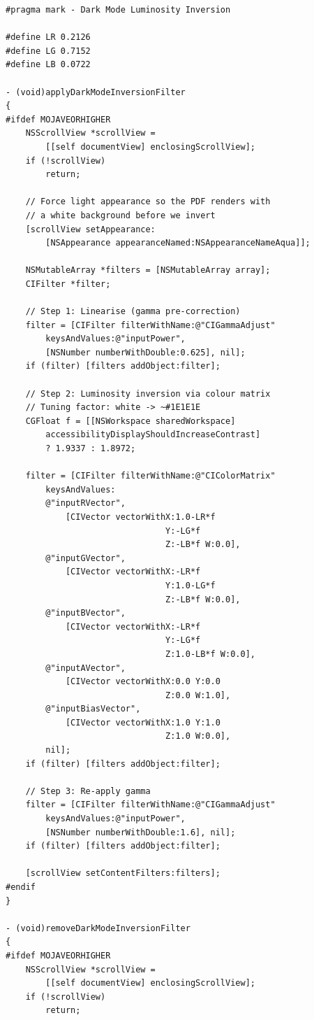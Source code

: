 \documentclass[11pt,a4paper]{article}
\begin{document}
\begin{lstlisting}
#pragma mark - Dark Mode Luminosity Inversion

#define LR 0.2126
#define LG 0.7152
#define LB 0.0722

- (void)applyDarkModeInversionFilter
{
#ifdef MOJAVEORHIGHER
    NSScrollView *scrollView =
        [[self documentView] enclosingScrollView];
    if (!scrollView)
        return;

    // Force light appearance so the PDF renders with
    // a white background before we invert
    [scrollView setAppearance:
        [NSAppearance appearanceNamed:NSAppearanceNameAqua]];

    NSMutableArray *filters = [NSMutableArray array];
    CIFilter *filter;

    // Step 1: Linearise (gamma pre-correction)
    filter = [CIFilter filterWithName:@"CIGammaAdjust"
        keysAndValues:@"inputPower",
        [NSNumber numberWithDouble:0.625], nil];
    if (filter) [filters addObject:filter];

    // Step 2: Luminosity inversion via colour matrix
    // Tuning factor: white -> ~#1E1E1E
    CGFloat f = [[NSWorkspace sharedWorkspace]
        accessibilityDisplayShouldIncreaseContrast]
        ? 1.9337 : 1.8972;

    filter = [CIFilter filterWithName:@"CIColorMatrix"
        keysAndValues:
        @"inputRVector",
            [CIVector vectorWithX:1.0-LR*f
                                Y:-LG*f
                                Z:-LB*f W:0.0],
        @"inputGVector",
            [CIVector vectorWithX:-LR*f
                                Y:1.0-LG*f
                                Z:-LB*f W:0.0],
        @"inputBVector",
            [CIVector vectorWithX:-LR*f
                                Y:-LG*f
                                Z:1.0-LB*f W:0.0],
        @"inputAVector",
            [CIVector vectorWithX:0.0 Y:0.0
                                Z:0.0 W:1.0],
        @"inputBiasVector",
            [CIVector vectorWithX:1.0 Y:1.0
                                Z:1.0 W:0.0],
        nil];
    if (filter) [filters addObject:filter];

    // Step 3: Re-apply gamma
    filter = [CIFilter filterWithName:@"CIGammaAdjust"
        keysAndValues:@"inputPower",
        [NSNumber numberWithDouble:1.6], nil];
    if (filter) [filters addObject:filter];

    [scrollView setContentFilters:filters];
#endif
}

- (void)removeDarkModeInversionFilter
{
#ifdef MOJAVEORHIGHER
    NSScrollView *scrollView =
        [[self documentView] enclosingScrollView];
    if (!scrollView)
        return;


\end{lstlisting}
\end{document}
